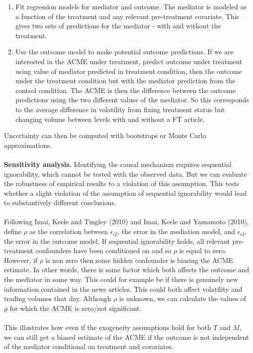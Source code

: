 \documentclass{article}
\begin{document}
	\begin{enumerate}
		\item Fit regression models for mediator and outcome. The mediator is modeled as a function of the treatment and any relevant pre-treatment covariate. This gives two sets of predictions for the mediator - with and without the treatment. 
		\item Use the outcome model to make potential outcome predictions. If we are interested in the ACME under treatment, predict outcome under treatment using value of mediator predicted in treatment condition, then the outcome under the treatment condition but with the mediator prediction from the control condition. The ACME is then the difference between the outcome predictions using the two different values of the mediator. So this corresponds to the average difference in volatility from fixing treatment status but changing volume between levels with and without a FT article.
	\end{enumerate}
	Uncertainty can then be computed with bootstraps or Monte Carlo approximations. 
	\\~\\
	\textbf{Sensitivity analysis.} Identifying the causal mechanism requires sequential ignorability, which cannot be tested with the observed data. But we can evaluate the robustness of empirical results to a violation of this assumption. This tests whether a slight violation of the assumption of sequential ignorability would lead to substantively different conclusions. 
	\\~\\
	Following Imai, Keele and Tingley (2010) and Imai, Keele and Yamamoto (2010), define $\rho$ as the correlation between $\epsilon_{i2}$, the error in the mediation model, and $\epsilon_{i3}$, the error in the outcome model. If sequential ignorability holds, all relevant pre-treatment confounders have been conditioned on and so $\rho$ is equal to zero. However, if $\rho$ is non zero then some hidden confounder is biasing the ACME estimate. In other words, there is some factor which both affects the outcome and the mediator in some way. This could for example be if there is genuinely new information contained in the news articles. This could both affect volatility and trading volumes that day. Although $\rho$ is unknown, we can calculate the values of $\rho$ for which the ACME is zero/not significant. 
	\\~\\
	This illustrates how even if the exogeneity assumptions hold for both $T$ and $M$, we can still get a biased estimate of the ACME if the outcome is not independent of the mediator conditional on treatment and covariates. 
\end{document}
